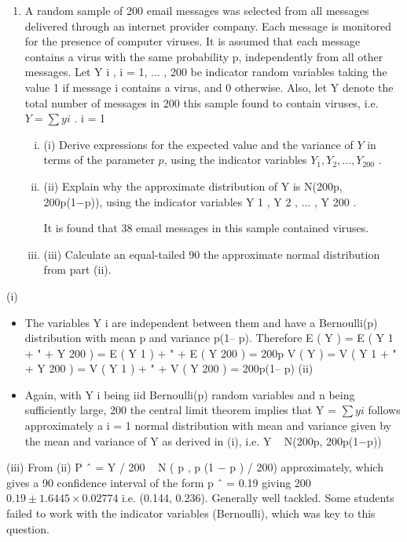 \documentclass[a4paper,12pt]{article}
\begin{document}
\begin{enumerate}



\item %
A random sample of 200 email messages was selected from all messages delivered through an internet provider company. Each message is monitored for the presence of
computer viruses. It is assumed that each message contains a virus with the same
probability p, independently from all other messages.
Let Y i , i = 1, ... , 200 be indicator random variables taking the value 1 if message i
contains a virus, and 0 otherwise. Also, let Y denote the total number of messages in
200
this sample found to contain viruses, i.e. $Y = \sum y i$ .
i = 1
\begin{enumerate}[(i)]
    \item (i) Derive expressions for the expected value and the variance of $Y$ in terms of the parameter $p$, using the indicator variables $Y_1 , Y_2 , ... , Y_200$ .
\item (ii) Explain why the approximate distribution of Y is N(200p, 200p(1−p)), using
the indicator variables Y 1 , Y 2 , ... , Y 200 .

It is found that 38 email messages in this sample contained viruses.
\item (iii)
Calculate an equal-tailed 90%
the approximate normal distribution from part (ii).
\end{enumerate}


\end{enumerate}

\newpage
(i)
\begin{itemize}
    \item The variables Y i are independent between them and have a Bernoulli(p)
distribution with mean p and variance p(1– p).
Therefore E ( Y ) = E ( Y 1 + " + Y 200 ) = E ( Y 1 ) + " + E ( Y 200 ) = 200p
V ( Y ) = V ( Y 1 + " + Y 200 ) = V ( Y 1 ) + " + V ( Y 200 ) = 200p(1– p)
(ii)
\item Again, with Y i being iid Bernoulli(p) random variables and n being sufficiently
large,
200
the central limit theorem implies that Y = $\sum y i$ follows approximately a
i = 1
normal distribution with mean and variance given by the mean and variance of
Y as derived in (i), i.e.
Y ~ N(200p, 200p(1−p))
\end{itemize}

(iii)
From (ii) P ˆ = Y / 200 ~ N ( p , p (1 − p ) / 200) approximately, which gives a 90%
confidence interval of the form
p ˆ = 0.19 giving
200
$0.19 \pm 1.6445 \times 0.02774$
i.e. (0.144, 0.236).
Generally well tackled. Some students failed to work with the indicator variables (Bernoulli),
which was key to this question.
\end{document}
